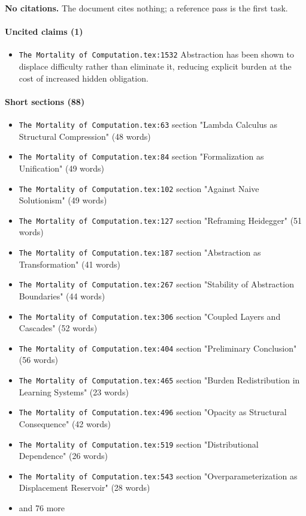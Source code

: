 \documentclass[11pt]{article}
\newcommand{\loc}[1]{{\small\color{muted}\texttt{#1}}}
\begin{document}
\textbf{No citations.} The document cites nothing; a reference pass is the first task.

\paragraph{Uncited claims (1)}
\begin{itemize}
\item \loc{The Mortality of Computation.tex:1532} Abstraction has been shown to displace difficulty rather than eliminate it, reducing explicit burden at the cost of increased hidden obligation.
\end{itemize}
\paragraph{Short sections (88)}
\begin{itemize}
\item \loc{The Mortality of Computation.tex:63} section "Lambda Calculus as Structural Compression" (48 words)
\item \loc{The Mortality of Computation.tex:84} section "Formalization as Unification" (49 words)
\item \loc{The Mortality of Computation.tex:102} section "Against Naive Solutionism" (49 words)
\item \loc{The Mortality of Computation.tex:127} section "Reframing Heidegger" (51 words)
\item \loc{The Mortality of Computation.tex:187} section "Abstraction as Transformation" (41 words)
\item \loc{The Mortality of Computation.tex:267} section "Stability of Abstraction Boundaries" (44 words)
\item \loc{The Mortality of Computation.tex:306} section "Coupled Layers and Cascades" (52 words)
\item \loc{The Mortality of Computation.tex:404} section "Preliminary Conclusion" (56 words)
\item \loc{The Mortality of Computation.tex:465} section "Burden Redistribution in Learning Systems" (23 words)
\item \loc{The Mortality of Computation.tex:496} section "Opacity as Structural Consequence" (42 words)
\item \loc{The Mortality of Computation.tex:519} section "Distributional Dependence" (26 words)
\item \loc{The Mortality of Computation.tex:543} section "Overparameterization as Displacement Reservoir" (28 words)
\item[] {\color{muted}\small and 76 more}
\end{itemize}
\appendix
\end{document}
